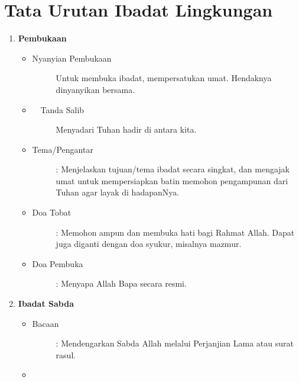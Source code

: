 \section{Tata Urutan Ibadat Lingkungan} 

\begin{enumerate}
\item {\large \textbf{Pembukaan}}
\begin{itemize}
\item \begin{description}
\item[Nyanyian Pembukaan]
Untuk membuka ibadat, mempersatukan umat. Hendaknya dinyanyikan bersama.
\end{description}

\item \begin{description}
\item[\Cross ~~Tanda Salib]
Menyadari Tuhan hadir di antara kita.
\end{description}

\item \begin{description}
\item[Tema/Pengantar]: Menjelaskan tujuan/tema ibadat secara singkat, dan
mengajak umat untuk mempersiapkan batin memohon pengampunan dari Tuhan
agar layak di hadapanNya.
\end{description}
\item \begin{description}
\item [Doa Tobat]: Memohon ampun dan membuka hati bagi Rahmat Allah. Dapat
juga diganti dengan doa syukur, misalnya mazmur.
\end{description}
\item \begin{description}
\item [Doa Pembuka]: Menyapa Allah Bapa secara resmi.
\end{description}
\end{itemize}

\item {\large \textbf{Ibadat Sabda}}
\begin{itemize}

\item \begin{description}
\item[Bacaan] : Mendengarkan Sabda Allah melalui Perjanjian Lama atau
surat rasul.
\end{description}
\item \begin{description}


\end{description}
\end{itemize}
\end{enumerate}
